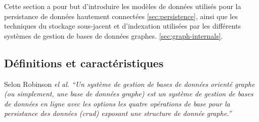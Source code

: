 Cette section a pour but d'introduire les modèles de données utilisés
pour la persistance de données hautement connectées
\ref{sec:persistence}, ainsi que les techniques du stockage
sous-jacent et d'indexation utilisées par les différents systèmes de
gestion de bases de données graphes.
\ref{sec:graph-internals}.\medskip

  \subsection{Définitions et caractéristiques}
  \label{sec:graphdb-defs}

  Selon Robinson \emph{el al.} \cite{robinson2013graph} \textit{``Un
    système de gestion de bases de données orienté graphe (ou
    simplement, une base de données graphe) est un système de gestion
    de bases de données en ligne avec les options les quatre
    opérations de base pour la persistance des données
    (\acrshort{crud}) exposant une structure de donnée
    graphe.''}\bigskip

